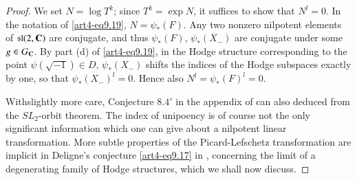 \begin{proof}
We set $N = \log T^k$; since $T^k = \exp N$, it suffices to show that $N^l = 0$. In the notation of \eqref{art4-eq9.19}, $N = \psi_\ast (F)$. Any two nonzero nilpotent elements of $\mathfrak{s}\mathfrak{l}(2, \mathbf{C})$ are conjugate, and thus $\psi_\ast (F)$, $\psi_\ast (X_-)$ are conjugate under some $g \in G_{\mathbf{C}}$. By part (d) of \eqref{art4-eq9.19}, in the Hodge structure corresponding to the point $\psi (\sqrt{-1}) \in D$, $\psi_\ast (X_-)$ shifts the indices of the Hodge subspaces exactly by one, so that $\psi_\ast (X_-)^l =0$. Hence also $N^l = \psi_\ast (F)^l = 0$.

With\pageoriginale slightly more care, Conjecture $8.4'$ in the appendix of \cite{art4-key21} can also deduced from the $SL_2$-orbit theorem. The index of unipoency is of course not the only significant information which one can give about a nilpotent linear transformation. More subtle properties of the Picard-Lefschetz transformation are implicit in Deligne's conjecture \eqref{art4-eq9.17} in \cite{art4-key21}, concerning the limit of a degenerating family of Hodge structures, which we shall now discuss.


\end{proof}
